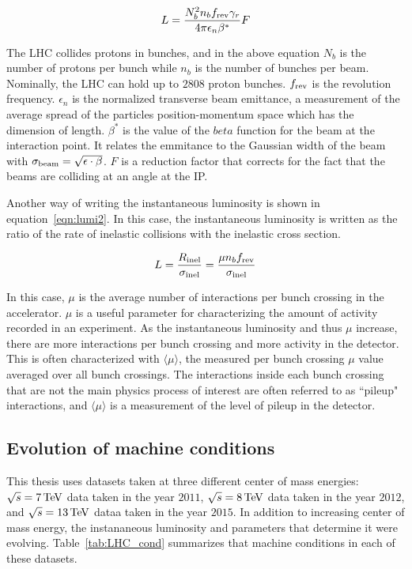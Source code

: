 \begin{equation}
\label{eqn:lumi}
L = \frac{N_b^2 n_b f_{\rm rev} \gamma_r}{4\pi \epsilon_n \beta^*} F
\end{equation}

The LHC collides protons in bunches, and in the above equation $N_b$ is the number of protons per bunch while $n_b$ is the number of bunches per beam. Nominally, the LHC can hold up to $2808$ proton bunches. $f_{\rm rev}$ is the revolution frequency. $\epsilon_n$ is the normalized transverse beam emittance, a measurement of the average spread of the particles position-momentum space which has the dimension of length. $\beta^*$ is the value of the $beta$ function for the beam at the interaction point. It relates the emmitance to the Gaussian width of the beam with $\sigma_{\rm beam} = \sqrt{\epsilon \cdot \beta}$. $F$ is a reduction factor that corrects for the fact that the beams are colliding at an angle at the IP. 

Another way of writing the instantaneous luminosity is shown in equation~\ref{eqn:lumi2}. In this case, the instantaneous luminosity is written as the ratio of the rate of inelastic collisions with the inelastic cross section\cite{lumi-paper}. 

\begin{equation}
\label{eqn:lumi2}
L = \frac{R_{\rm inel}}{\sigma_{\rm inel}} = \frac{\mu n_b f_{\rm rev}}{\sigma_{\rm inel}}
\end{equation}

In this case, $\mu$ is the average number of interactions per bunch crossing in the accelerator. $\mu$ is a useful parameter for characterizing the amount of activity recorded in an experiment. As the instantaneous luminosity and thus $\mu$ increase, there are more interactions per bunch crossing and more activity in the detector. This is often characterized with $\langle \mu \rangle$, the measured per bunch crossing $\mu$ value averaged over all bunch crossings. The interactions inside each bunch crossing that are not the main physics process of interest are often referred to as ``pileup" interactions, and $\langle \mu \rangle$ is a measurement of the level of pileup in the detector. 

\subsection{Evolution of machine conditions}

This thesis uses datasets taken at three different center of mass energies: $\sqrt{s} = 7 \TeV$ data taken in the year $2011$, $\sqrt{s} = 8 \TeV$ data taken in the year $2012$, and $\sqrt{s} = 13 \TeV$ dataa taken in the year $2015$. In addition to increasing center of mass energy, the instananeous luminosity and parameters that determine it were evolving. Table~\ref{tab:LHC_cond} summarizes that machine conditions in each of these datasets. 

